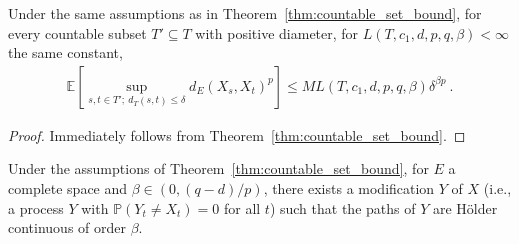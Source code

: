 \begin{corollary}\label{cor:countable_set_bound_of_le}
Under the same assumptions as in Theorem~\ref{thm:countable_set_bound}, for every countable subset $T' \subseteq T$ with positive diameter, for $L(T, c_1, d, p, q, \beta) < \infty$ the same constant,
\begin{align*}
  \mathbb{E}\left[ \sup_{s, t \in T';\: d_T(s, t) \le \delta} d_E(X_s, X_t)^p \right]
  \le M L(T, c_1, d, p, q, \beta) \delta^{\beta p}
  \: .
\end{align*}
\end{corollary}

\begin{proof}
Immediately follows from Theorem~\ref{thm:countable_set_bound}.
\end{proof}


\begin{lemma}\label{lem:holder_modification_single}
Under the assumptions of Theorem~\ref{thm:countable_set_bound}, for $E$ a complete space and $\beta \in (0, (q - d)/p)$, there exists a modification $Y$ of $X$ (i.e., a process $Y$ with $\mathbb{P}(Y_t \ne X_t) = 0$ for all $t$) such that the paths of $Y$ are Hölder continuous of order $\beta$.
\end{lemma}


